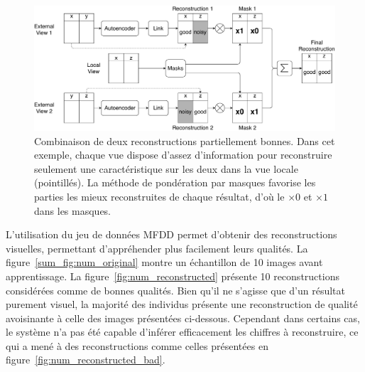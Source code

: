 \begin{figure}[H]
    \centering
    \includegraphics[scale=.38]{img/process_mwm}
    \caption{Combinaison de deux reconstructions partiellement bonnes. Dans cet exemple, chaque vue dispose d'assez d'information pour reconstruire seulement une caractéristique sur les deux dans la vue locale (pointillés). La méthode de pondération par masques favorise les parties les mieux reconstruites de chaque résultat, d'où le $\times 0$ et $\times 1$ dans les masques.}
\label{sum_fig:sum_process_mwm}
\end{figure}

L'utilisation du jeu de données MFDD permet d'obtenir des reconstructions visuelles, permettant d'appréhender plus facilement leurs qualités. La figure~\ref{sum_fig:num_original} montre un échantillon de 10 images avant apprentissage. La figure~\ref{fig:num_reconstructed} présente 10 reconstructions considérées comme de bonnes qualités. Bien qu'il ne s'agisse que d'un résultat purement visuel, la majorité des individus présente une reconstruction de qualité avoisinante à celle des images présentées ci-dessous. Cependant dans certains cas, le système n'a pas été capable d'inférer efficacement les chiffres à reconstruire, ce qui a mené à des reconstructions comme celles présentées en figure~\ref{fig:num_reconstructed_bad}.

